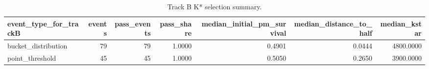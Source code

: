 \begin{table}
\caption{Track B K* selection summary.}
\label{tab:trackB_kstar_summary}
\begin{tabular}{lrrrrrr}
\toprule
event\_type\_for\_trackB & events & pass\_events & pass\_share & median\_initial\_pm\_survival & median\_distance\_to\_half & median\_kstar \\
\midrule
bucket\_distribution & 79 & 79 & 1.0000 & 0.4901 & 0.0444 & 4800.0000 \\
point\_threshold & 45 & 45 & 1.0000 & 0.5050 & 0.2650 & 3900.0000 \\
\bottomrule
\end{tabular}
\end{table}

